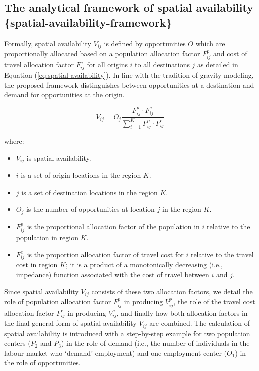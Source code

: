 \documentclass[]{elsarticle} %
\providecommand{\tightlist}{%
  \setlength{\itemsep}{0pt}\setlength{\parskip}{0pt}}
\begin{document}
\hypertarget{the-analytical-framework-of-spatial-availability-spatial-availability-framework}{%
\subsection{The analytical framework of spatial availability
\{spatial-availability-framework\}}\label{the-analytical-framework-of-spatial-availability-spatial-availability-framework}}

Formally, spatial availability \(V_{ij}\) is defined by opportunities
\(O\) which are proportionally allocated based on a population
allocation factor \(F^p_{ij}\) and cost of travel allocation factor
\(F^c_{ij}\) for all origins \(i\) to all destinations \(j\) as detailed
in Equation (\ref{eq:spatial-availability}). In line with the tradition
of gravity modeling, the proposed framework distinguishes between
opportunities at a destination and demand for opportunities at the
origin.

\begin{equation}
\label{eq:spatial-availability}
V_{ij} = O_j\frac{F^p_{ij} \cdot F^c_{ij}}{\sum_{i=1}^K F^p_{ij} \cdot F^c_{ij}}
\end{equation}

\noindent where:

\begin{itemize}
\tightlist
\item
  \(V_{ij}\) is spatial availability.
\item
  \(i\) is a set of origin locations in the region \(K\).
\item
  \(j\) is a set of destination locations in the region \(K\).
\item
  \(O_j\) is the number of opportunities at location \(j\) in the region
  \(K\).
\item
  \(F^p_{ij}\) is the proportional allocation factor of the population
  in \(i\) relative to the population in region \(K\).
\item
  \(F^c_{ij}\) is the proportion allocation factor of travel cost for
  \(i\) relative to the travel cost in region \(K\); it is a product of
  a monotonically decreasing (i.e., impedance) function associated with
  the cost of travel between \(i\) and \(j\).
\end{itemize}

Since spatial availability \(V_{ij}\) consists of these two allocation
factors, we detail the role of population allocation factor \(F^p_{ij}\)
in producing \(V^p_{ij}\), the role of the travel cost allocation factor
\(F^c_{ij}\) in producing \(V^c_{ij}\), and finally how both allocation
factors in the final general form of spatial availability \(V_{ij}\) are
combined. The calculation of spatial availability is introduced with a
step-by-step example for two population centers (\(P_2\) and \(P_3\)) in
the role of demand (i.e., the number of individuals in the labour market
who `demand' employment) and one employment center (\(O_1\)) in the role
of opportunities.
\end{document}
